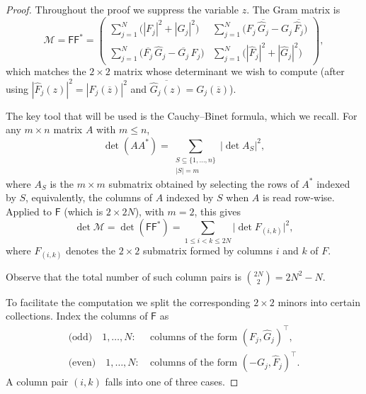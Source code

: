 \documentclass[11pt]{amsart}
\begin{document}
\begin{proof}
Throughout the proof we suppress the variable $z$. The Gram matrix is
\[
\mathcal{M} =  \mathsf{F}\mathsf{F}^* =
\begin{pmatrix}
\displaystyle\sum_{j=1}^{N}\bigl(|F_j|^2 + |G_j|^2\bigr) & \displaystyle\sum_{j=1}^{N}\bigl(F_j\,\overline{\hat G_j} - G_j\,\overline{\hat F_j}\bigr)
 \\[0.6em]
\displaystyle\sum_{j=1}^{N}\bigl(\overline{F_j}\,\hat G_j - \overline{G_j}\,\hat F_j\bigr) &
\displaystyle\sum_{j=1}^{N}\bigl(|\hat F_j|^2 + |\hat G_j|^2\bigr)
\end{pmatrix},
\]
which matches the $2 \times 2$ matrix whose determinant we wish to compute (after using $|\hat F_j(z)|^2 = |F_j(\overline z)|^2$ and $\overline{\hat G_j(z)} = G_j(\overline z)$).

\bigskip

The key tool that will be used is the Cauchy--Binet formula, which we recall.  For any $m \times n$ matrix $A$ with $m \le n$,
\begin{equation}\label{eq:CB}
\det(A A^*) = \sum_{\substack{S \subseteq \{1,\ldots,n\} \\ |S| = m}} \bigl|\det A_S\bigr|^2,
\end{equation}
where $A_S$ is the $m \times m$ submatrix obtained by selecting the rows of $A^*$ indexed by $S$, equivalently, the columns of $A$ indexed by $S$ when $A$ is read row-wise. Applied to $\mathsf{F}$ (which is $2 \times 2N$), with $m = 2$, this gives
\begin{equation}\label{eq:CB-applied}
\det\mathcal{M} = \det( \mathsf{F} \mathsf{F}^*) = \sum_{1 \le i < k \le 2N} \bigl|\det F_{(i,k)}\bigr|^2,
\end{equation}
where $ F_{(i,k)}$ denotes the $2 \times 2$ submatrix formed by columns $i$ and $k$ of $F$.

Observe that the total number of such column pairs is $\binom{2N}{2} = 2N^2 - N$.

\bigskip

To facilitate the computation we split the corresponding $2 \times 2$ minors into certain collections. Index the columns of $\mathsf{F}$ as
\begin{align*}
\text{(odd)} \quad 1,\ldots,N: & \ \text{columns of the form } (F_j, \hat G_j)^{\top},\\
\text{(even)} \quad 1,\ldots,N:&  \ \text{columns of the form } (-G_{j}, \hat F_{j})^{\top}.
\end{align*}
A column pair $(i,k)$ falls into one of three cases.


\end{proof}
\end{document}
